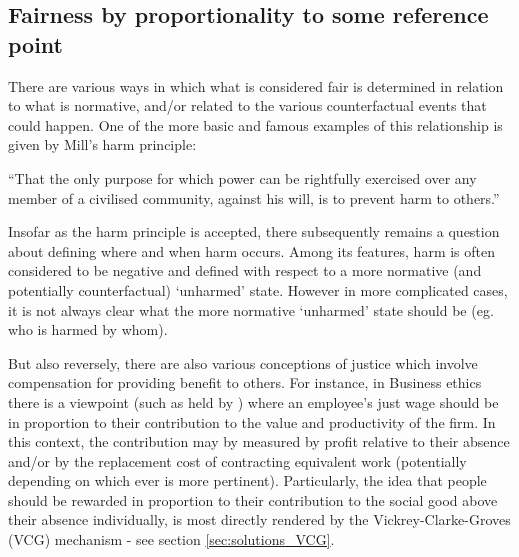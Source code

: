 \subsection{Fairness by proportionality to some reference point}\label{sec:reference_points}

There are various ways in which what is considered fair is determined in relation to what is normative, and/or related to the various counterfactual events that could happen.
One of the more basic and famous examples of this relationship is given by Mill's harm principle:

\begin{displayquote}
``That the only purpose for which power can be rightfully exercised over any member of a civilised community, against his will, is to prevent harm to others.'' \cite[Chapter 1]{Mill2Gutenberg}
\end{displayquote}

Insofar as the harm principle is accepted, there subsequently remains a question about defining where and when harm occurs.
Among its features, harm is often considered to be negative and defined with respect to a more normative (and potentially counterfactual) `unharmed' state.
However in more complicated cases, it is not always clear what the more normative `unharmed' state should be (eg. who is harmed by whom).

But also reversely, there are also various conceptions of justice which involve compensation for providing benefit to others.
For instance, in Business ethics there is a viewpoint (such as held by \cite{sternberg2000just}) where an employee's just wage should be in proportion to their contribution to the value and productivity of the firm.
In this context, the contribution may by measured by profit relative to their absence and/or by the replacement cost of contracting equivalent work (potentially depending on which ever is more pertinent).
Particularly, the idea that people should be rewarded in proportion to their contribution to the social good above their absence individually, is most directly rendered by the Vickrey-Clarke-Groves (VCG) mechanism - see section \ref{sec:solutions_VCG}.

